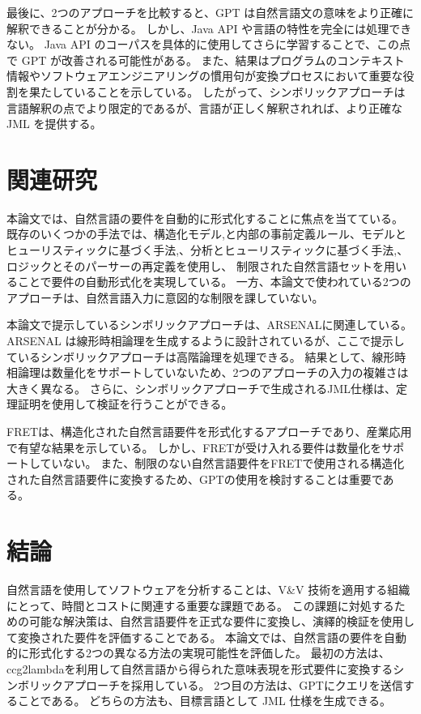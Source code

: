 \documentclass[uplatex, twocolumn,10pt]{jsarticle} %
\begin{document}
最後に、2つのアプローチを比較すると、GPT は自然言語文の意味をより正確に解釈できることが分かる。
しかし、Java API や言語の特性を完全には処理できない。
Java API のコーパスを具体的に使用してさらに学習することで、この点で GPT が改善される可能性がある。
また、結果はプログラムのコンテキスト情報やソフトウェアエンジニアリングの慣用句が変換プロセスにおいて重要な役割を果たしていることを示している。
したがって、シンボリックアプローチは言語解釈の点でより限定的であるが、言語が正しく解釈されれば、より正確な JML を提供する。

\section{関連研究}
\label{sec:related_work}
本論文では、自然言語の要件を自動的に形式化することに焦点を当てている。
既存のいくつかの手法では、構造化モデル\cite{8},\cite{9}と内部の事前定義ルール\cite{10}、モデルとヒューリスティックに基づく手法\cite{11},\cite{12}、分析とヒューリスティックに基づく手法\cite{13},\cite{14}、ロジックとそのパーサーの再定義\cite{15}を使用し、
制限された自然言語セットを用いることで要件の自動形式化を実現している。
一方、本論文で使われている2つのアプローチは、自然言語入力に意図的な制限を課していない。

本論文で提示しているシンボリックアプローチは、ARSENAL\cite{16}に関連している。
ARSENAL は線形時相論理を生成するように設計されているが、ここで提示しているシンボリックアプローチは高階論理を処理できる。
結果として、線形時相論理は数量化をサポートしていないため、2つのアプローチの入力の複雑さは大きく異なる。
さらに、シンボリックアプローチで生成されるJML仕様は、定理証明を使用して検証を行うことができる。

FRET\cite{17}は、構造化された自然言語要件を形式化するアプローチであり、産業応用で有望な結果を示している。
しかし、FRETが受け入れる要件は数量化をサポートしていない。
また、制限のない自然言語要件をFRETで使用される構造化された自然言語要件に変換するため、GPTの使用を検討することは重要である。

\section{結論}
\label{sec:conclusion}
自然言語を使用してソフトウェアを分析することは、V\&V 技術を適用する組織にとって、時間とコストに関連する重要な課題である。
この課題に対処するための可能な解決策は、自然言語要件を正式な要件に変換し、演繹的検証を使用して変換された要件を評価することである。
本論文では、自然言語の要件を自動的に形式化する2つの異なる方法の実現可能性を評価した。
最初の方法は、ccg2lambda\cite{3}を利用して自然言語から得られた意味表現を形式要件に変換するシンボリックアプローチを採用している。
2つ目の方法は、GPT\cite{2}にクエリを送信することである。
どちらの方法も、目標言語として JML 仕様を生成できる。
\end{document}
